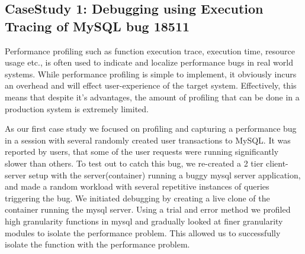 \iffalse
\subsection{CaseStudy 1: Debugging using Execution Tracing of MySQL bug 18511}  
Performance profiling such as function execution trace, execution time, resource usage etc., is often used to indicate and localize performance bugs in real world systems. 
While performance profiling is simple to implement, it obviously incurs an overhead and will effect user-experience of the target system.
Effectively, this means that despite it's advantages, the amount of profiling that can be done in a production system is extremely limited. 

As our first case study we focused on profiling and capturing a performance bug in a session with several randomly created user transactions to MySQL. 
It was reported by users, that some of the user requests were running significantly slower than others.
To test out \parikshan to catch this bug, we re-created a 2 tier client-server setup with the server(container) running a buggy mysql server application, and made a random workload with several repetitive instances of queries triggering the bug.
We initiated debugging by creating a live clone of the container running the mysql server.
Using a trial and error method we profiled high granularity functions in mysql and gradually looked at finer granularity modules to isolate the performance problem.
This allowed us to successfully isolate the function with the performance problem.

